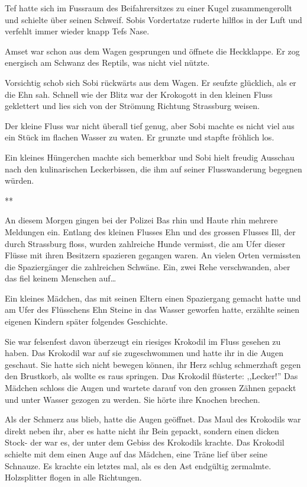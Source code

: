 \documentclass[11pt,titlepage,a5paper]{book}
\newcommand{\sterne}{\par{\centering ***\par}}
\begin{document}
Tef hatte sich im Fussraum des Beifahrersitzes zu einer Kugel zusammengerollt und schielte über seinen Schweif. Sobis Vordertatze ruderte hilflos in der Luft und verfehlt immer wieder knapp Tefs Nase. 

Amset war schon aus dem Wagen gesprungen und öffnete die Heckklappe. Er zog energisch am Schwanz des Reptils, was nicht viel nützte.

Vorsichtig schob sich Sobi rückwärts aus dem Wagen. Er seufzte glücklich, als er die Ehn sah. Schnell wie der Blitz war der Krokogott in den kleinen Fluss geklettert und lies sich von der Strömung Richtung Strassburg weisen.

Der kleine Fluss war nicht überall tief genug, aber Sobi machte es nicht viel aus ein Stück im flachen Wasser zu waten. Er grunzte und stapfte fröhlich los.

Ein kleines Hüngerchen machte sich bemerkbar und Sobi hielt freudig Ausschau nach den kulinarischen Leckerbissen, die ihm auf seiner Flusswanderung begegnen würden. 

\sterne

An diesem Morgen gingen bei der Polizei Bas rhin und Haute rhin mehrere Meldungen ein. Entlang des kleinen Flusses Ehn und des grossen Flusses Ill, der durch Strassburg floss, wurden zahlreiche Hunde vermisst, die am Ufer dieser Flüsse mit ihren Besitzern spazieren gegangen waren. An vielen Orten vermissten die Spaziergänger die zahlreichen Schwäne. Ein, zwei Rehe verschwanden, aber das fiel keinem Menschen auf\dots 

Ein kleines Mädchen, das mit seinen Eltern einen Spaziergang gemacht hatte und am Ufer des Flüsschens Ehn Steine in das Wasser geworfen hatte, erzählte seinen eigenen Kindern später folgendes Geschichte. 

Sie war felsenfest davon überzeugt ein riesiges Krokodil im Fluss gesehen zu haben. Das Krokodil war auf sie zugeschwommen und hatte ihr in die Augen geschaut. Sie hatte sich nicht bewegen können, ihr Herz schlug schmerzhaft gegen den Brustkorb, als wollte es raus springen. Das Krokodil flüsterte: ,,Lecker!'' Das Mädchen schloss die Augen und wartete darauf von den grossen Zähnen gepackt und unter Wasser gezogen zu werden. Sie hörte ihre Knochen brechen.

Als der Schmerz aus blieb, hatte die Augen geöffnet. Das Maul des Krokodils war direkt neben ihr, aber es hatte nicht ihr Bein gepackt, sondern einen dicken Stock- der war es, der unter dem Gebiss des Krokodils krachte.
Das Krokodil schielte mit dem einen Auge auf das Mädchen, eine Träne lief über seine Schnauze. Es krachte ein letztes mal, als es den Ast endgültig zermalmte. Holzsplitter flogen in alle Richtungen.
\end{document}

